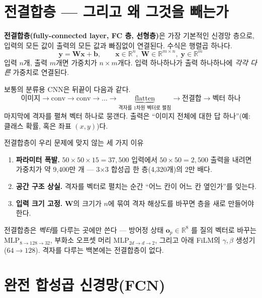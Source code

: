 \documentclass[11pt]{article}
\begin{document}
\section{전결합층 --- 그리고 왜 그것을 빼는가}

\textbf{전결합층(fully-connected layer, FC 층, 선형층)}은 가장 기본적인 신경망 층으로, 입력의 모든
값이 출력의 모든 값과 빠짐없이 연결된다. 수식은 행렬곱 하나다.
\[
\mathbf{y} = \mathbf{W}\mathbf{x} + \mathbf{b}, \qquad
\mathbf{x} \in \mathbb{R}^{n},\; \mathbf{W} \in \mathbb{R}^{m \times n},\; \mathbf{y} \in \mathbb{R}^{m}
\]
입력 $n$개, 출력 $m$개면 가중치가 $n \times m$개다. 입력 하나하나가 출력 하나하나에 \emph{각각 다른}
가중치로 연결된다.

보통의 분류용 CNN은 뒤끝이 다음과 같다.
\[
\text{이미지} \to \text{conv} \to \text{conv} \to \dots \to
\underbrace{\text{flatten}}_{\text{격자를 1차원 벡터로 펼침}} \to \text{전결합} \to \text{벡터 하나}
\]
마지막에 격자를 펼쳐 벡터 하나로 뭉갠다. 출력은 ``이미지 전체에 대한 답 하나''(예: 클래스 확률, 혹은
좌표 $(x,y)$)다.

\begin{keybox}{전결합층이 우리 문제에 맞지 않는 세 가지 이유}
\begin{enumerate}[leftmargin=*, itemsep=2pt]
\item \textbf{파라미터 폭발.} $50\times50\times15 = 37{,}500$ 입력에서 $50\times50 = 2{,}500$ 출력을 내려면
      가중치가 약 9,400만 개 --- 3$\times$3 합성곱 한 층(4,320개)의 2만 배다.
\item \textbf{공간 구조 상실.} 격자를 벡터로 펼치는 순간 ``어느 칸이 어느 칸 옆인가''를 잊는다.
\item \textbf{입력 크기 고정.} $\mathbf{W}$의 크기가 $n$에 묶여 격자 해상도를 바꾸면 층을 새로 만들어야 한다.
\end{enumerate}
\end{keybox}

\begin{whybox}
전결합층은 \emph{벡터}를 다루는 곳에만 쓴다 --- 방어정 상태 $\mathbf{o}_p \in \mathbb{R}^8$ 를 질의 벡터로
바꾸는 $\mathrm{MLP}_{8\to128\to32}$, 부화소 오프셋 머리 $\mathrm{MLP}_{2d\to d\to 2}$, 그리고 아래 FiLM의
$\gamma, \beta$ 생성기($64 \to 128$). 격자를 다루는 백본에는 전결합층이 없다.
\end{whybox}

\section{완전 합성곱 신경망(FCN)}
\end{document}
